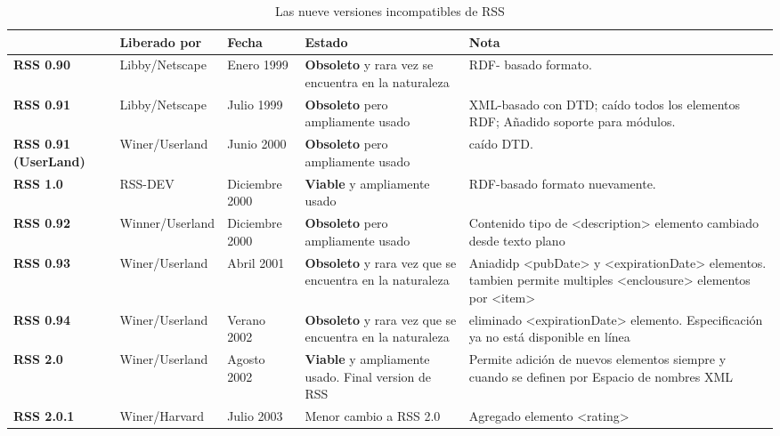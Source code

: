 \begin{table}[h]

\centering

\begin{tabular}{>{\centering\arraybackslash}m{.1\linewidth} |>{\centering\arraybackslash}m{.2\linewidth}|>{\centering\arraybackslash}m{.1\linewidth}|>{\centering\arraybackslash}m{.2\linewidth}|>{\centering\arraybackslash}m{.4\linewidth}}
 & \textbf{Liberado por} & \textbf{Fecha} & \textbf{Estado} & \textbf{Nota} \\
\hline

\textbf{RSS 0.90} & Libby/Netscape & Enero 1999 & \textbf{Obsoleto} y rara vez se encuentra en la naturaleza & RDF- basado formato. \\
\hline

\textbf{RSS 0.91 } & Libby/Netscape & Julio 1999 & \textbf{Obsoleto} pero ampliamente usado & XML-basado con DTD; caído todos los elementos RDF; Añadido soporte para módulos. \\
\hline 

\textbf{RSS 0.91 (UserLand) } & Winer/Userland & Junio 2000 & \textbf{Obsoleto} pero ampliamente usado & caído DTD. \\
\hline 

\textbf{RSS 1.0} & RSS-DEV & Diciembre 2000 & \textbf{Viable} y ampliamente usado & RDF-basado formato nuevamente.\\
\hline

\textbf{RSS 0.92} & Winner/Userland & Diciembre 2000 & \textbf{Obsoleto} pero ampliamente usado & Contenido tipo de <description> elemento cambiado desde texto plano\\
\hline

\textbf{RSS 0.93} & Winer/Userland & Abril 2001 & \textbf{Obsoleto} y rara vez que se encuentra en la naturaleza & Aniadidp <pubDate> y <expirationDate> elementos. tambien permite multiples <enclousure> elementos por <item> \\
\hline

\textbf{RSS 0.94} & Winer/Userland & Verano 2002 & \textbf{Obsoleto} y rara vez que se encuentra en la naturaleza & eliminado <expirationDate> elemento. Especificación ya no está disponible en línea\\
\hline

\textbf{RSS 2.0} & Winer/Userland & Agosto 2002 & \textbf{Viable} y ampliamente usado. Final version de RSS & Permite adición de nuevos elementos siempre y cuando se definen por Espacio de nombres XML\\
\hline 

\textbf{RSS 2.0.1} & Winer/Harvard & Julio 2003 & Menor cambio a RSS 2.0 & Agregado elemento <rating>\\
\hline 

\end{tabular}

\caption{Las nueve versiones incompatibles de RSS}

\end{table}

